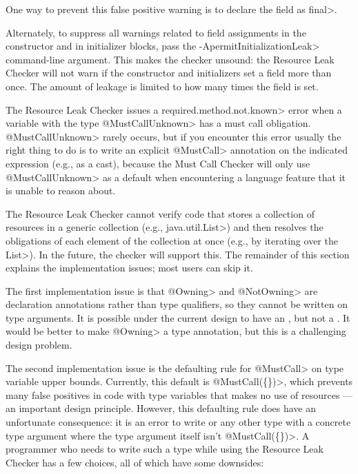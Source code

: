 One way to prevent this false positive warning is to declare the field as \<final>.

Alternately, to suppress all warnings related to field assignments in the
constructor and in initializer blocks, pass the
\<-ApermitInitializationLeak> command-line argument.  This makes the
checker unsound:  the Resource Leak Checker will not warn if the constructor
and initializers set a field more than once.  The amount of leakage is
limited to how many times the field is set.


The Resource Leak Checker issues a \<required.method.not.known> error
when a variable with the type \<@MustCallUnknown> has a must call obligation.
\<@MustCallUnknown> rarely occurs, but if you encounter this error usually
the right thing to do is to write an explicit \<@MustCall> annotation
on the indicated expression (e.g., as a cast), because the Must Call Checker
will only use \<@MustCallUnknown> as a default when encountering a language
feature that it is unable to reason about.


The Resource Leak Checker cannot verify code that stores a collection of
resources in a generic collection (e.g., \<java.util.List>) and then
resolves the obligations of each element of the collection at once (e.g.,
by iterating over the \<List>).  In the future, the checker will support
this.  The remainder of this section explains the implementation issues;
most users can skip it.

The first implementation issue is that \<@Owning> and \<@NotOwning> are
declaration annotations rather than type qualifiers, so they cannot be
written on type arguments. It is possible under the current design to have
an , but not a .
It would be better to make \<@Owning> a type annotation, but this is a
challenging design problem.

The second implementation issue is the defaulting rule for \<@MustCall> on
type variable upper bounds.  Currently, this default is \<@MustCall(\{\})>,
which prevents many false positives in code with type variables that makes
no use of resources --- an important design principle.
However, this defaulting rule does have an unfortunate consequence: it is
an error to write  or any other type with a concrete
type argument where the type argument itself isn't \<@MustCall(\{\})>. A programmer who
needs to write such a type while using the Resource Leak Checker has a few
choices, all of which have some downsides:

